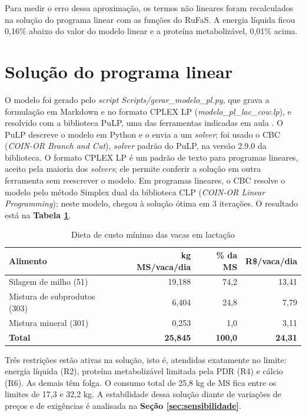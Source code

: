 \documentclass[a4paper,12pt]{article}
\begin{document}
Para medir o erro dessa aproximação, os termos não lineares foram recalculados na solução do programa linear com as funções do RuFaS. A energia líquida ficou 0,16\% abaixo do valor do modelo linear e a proteína metabolizável, 0,01\% acima.

\section{Solução do programa linear}\label{sec:solucao}

O modelo foi gerado pelo \textit{script Scripts/\allowbreak gerar\_\allowbreak modelo\_\allowbreak pl.py}, que grava a formulação em Markdown e no formato CPLEX LP (\textit{modelo\_pl\_lac\_cow.lp}), e resolvido com a biblioteca PuLP, uma das ferramentas indicadas em aula \cite{slides:rufas}. O PuLP descreve o modelo em Python e o envia a um \textit{solver}; foi usado o CBC (\textit{COIN-OR Branch and Cut}), \textit{solver} padrão do PuLP, na versão 2.9.0 da biblioteca. O formato CPLEX LP é um padrão de texto para programas lineares, aceito pela maioria dos \textit{solvers}; ele permite conferir a solução em outra ferramenta sem reescrever o modelo. Em programas lineares, o CBC resolve o modelo pelo método Simplex dual da biblioteca CLP (\textit{COIN-OR Linear Programming}); neste modelo, chegou à solução ótima em 3 iterações. O resultado está na \textbf{Tabela \ref{tab:solucao}}.

\begin{table}[htbp]
    \centering
    \caption{Dieta de custo mínimo das vacas em lactação}
    \label{tab:solucao}
    \begin{tabular}{lrrr}
        \toprule
        \textbf{Alimento} & \textbf{kg MS/vaca/dia} & \textbf{\% da MS} & \textbf{R\$/vaca/dia} \\
        \midrule
        \rowcolor{gray!15}
        Silagem de milho (51) & 19,188 & 74,2 & 13,41 \\
        Mistura de subprodutos (303) & 6,404 & 24,8 & 7,79 \\
        \rowcolor{gray!15}
        Mistura mineral (301) & 0,253 & 1,0 & 3,11 \\
        \midrule
        \textbf{Total} & \textbf{25,845} & \textbf{100,0} & \textbf{24,31} \\
        \bottomrule
    \end{tabular}
\end{table}

Três restrições estão ativas na solução, isto é, atendidas exatamente no limite: energia líquida (R2), proteína metabolizável limitada pela PDR (R4) e cálcio (R6). As demais têm folga. O consumo total de 25,8 kg de MS fica entre os limites de 17,3 e 32,2 kg. A estabilidade dessa solução diante de variações de preços e de exigências é analisada na \textbf{Seção \ref{sec:sensibilidade}}.
\end{document}

